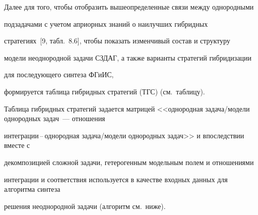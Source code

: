  Далее для того, чтобы отобразить вышеопределенные связи между однородными


подзадачами с учетом априорных знаний о наилучших гибридных


стратегиях~[9, табл.~8.6], чтобы показать изменчивый состав и структуру


модели неоднородной задачи СЗДАГ, а также варианты стратегий гибридизации


для последующего синтеза ФГиИС,


формируется таблица гибридных стратегий (ТГС) (см.\ таблицу).





 Таблица гибридных стратегий задается матрицей <<однородная задача/модели однородных задач~--- отношения


интеграции\,--\,однородная задача/модели однородных задач>> и впоследствии вместе с


декомпозицией сложной задачи, гетерогенным модельным полем и отношениями


интеграции и соответствия используется в качестве входных данных для алгоритма синтеза


решения неоднородной задачи (алгоритм см.\ ниже).





